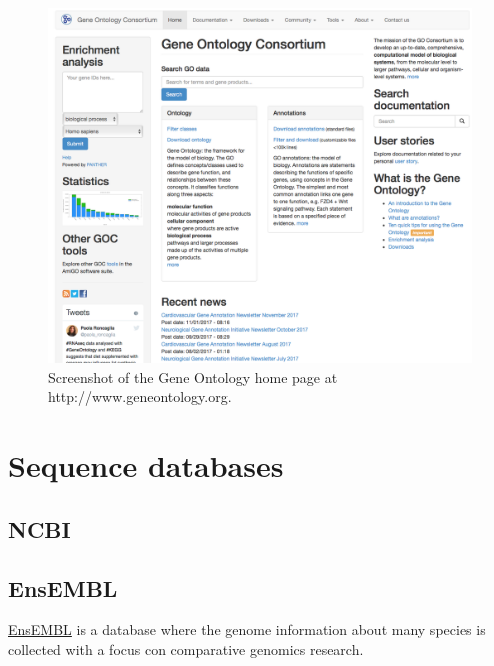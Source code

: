 \documentclass[]{book}
\theoremstyle{definition}
\theoremstyle{definition}
\theoremstyle{definition}
\theoremstyle{remark}
\begin{document}
\begin{figure}
\includegraphics[width=16.21in]{pic/go_web} \caption{Screenshot of the Gene Ontology home page at http://www.geneontology.org.}\label{fig:go-web}
\end{figure}

\section{Sequence databases}\label{sequence-databases}

\subsection{NCBI}\label{ncbi}

\subsection{EnsEMBL}\label{ensembl}

\href{https://www.ensembl.org}{EnsEMBL} is a database where the genome
information about many species is collected with a focus con comparative
genomics research.
\end{document}
